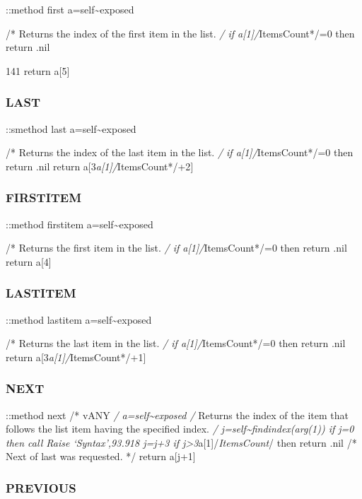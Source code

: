 ::method first a=self\textasciitilde exposed

/* Returns the index of the first item in the list. \emph{/ if
a{[}1{]}/}ItemsCount*/=0 then return .nil

141 return a{[}5{]}

\hypertarget{last}{%
\subsubsection{LAST}\label{last}}

::smethod last a=self\textasciitilde exposed

/* Returns the index of the last item in the list. \emph{/ if
a{[}1{]}/}ItemsCount*/=0 then return .nil return
a{[}3\emph{a{[}1{]}/}ItemsCount*/+2{]}

\hypertarget{firstitem}{%
\subsubsection{FIRSTITEM}\label{firstitem}}

::method firstitem a=self\textasciitilde exposed

/* Returns the first item in the list. \emph{/ if
a{[}1{]}/}ItemsCount*/=0 then return .nil return a{[}4{]}

\hypertarget{lastitem}{%
\subsubsection{LASTITEM}\label{lastitem}}

::method lastitem a=self\textasciitilde exposed

/* Returns the last item in the list. \emph{/ if
a{[}1{]}/}ItemsCount*/=0 then return .nil return
a{[}3\emph{a{[}1{]}/}ItemsCount*/+1{]}

\hypertarget{next}{%
\subsubsection{NEXT}\label{next}}

::method next /* vANY \emph{/ a=self\textasciitilde exposed /} Returns
the index of the item that follows the list item having the specified
index. \emph{/ j=self\textasciitilde findindex(arg(1)) if j=0 then call
Raise `Syntax',93.918 j=j+3 if
j\textgreater3}a{[}1{]}/\emph{ItemsCount}/ then return .nil /* Next of
last was requested. */ return a{[}j+1{]}

\hypertarget{previous}{%
\subsubsection{PREVIOUS}\label{previous}}

